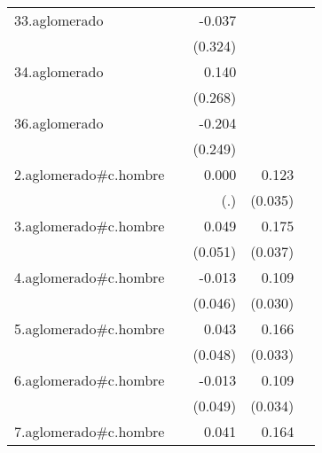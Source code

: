 {\begin{longtable}{l*{4}{D{.}{.}{-1}}}
\addlinespace
33.aglomerado&                     &      -0.037         &                     &                     \\
            &                     &     (0.324)         &                     &                     \\
\addlinespace
34.aglomerado&                     &       0.140         &                     &                     \\
            &                     &     (0.268)         &                     &                     \\
\addlinespace
36.aglomerado&                     &      -0.204         &                     &                     \\
            &                     &     (0.249)         &                     &                     \\
\addlinespace
2.aglomerado#c.hombre&                     &       0.000         &       0.123\sym{***}&                     \\
            &                     &         (.)         &     (0.035)         &                     \\
\addlinespace
3.aglomerado#c.hombre&                     &       0.049         &       0.175\sym{***}&                     \\
            &                     &     (0.051)         &     (0.037)         &                     \\
\addlinespace
4.aglomerado#c.hombre&                     &      -0.013         &       0.109\sym{***}&                     \\
            &                     &     (0.046)         &     (0.030)         &                     \\
\addlinespace
5.aglomerado#c.hombre&                     &       0.043         &       0.166\sym{***}&                     \\
            &                     &     (0.048)         &     (0.033)         &                     \\
\addlinespace
6.aglomerado#c.hombre&                     &      -0.013         &       0.109\sym{**} &                     \\
            &                     &     (0.049)         &     (0.034)         &                     \\
\addlinespace
7.aglomerado#c.hombre&                     &       0.041         &       0.164\sym{***}&                     \\

\end{longtable}}
